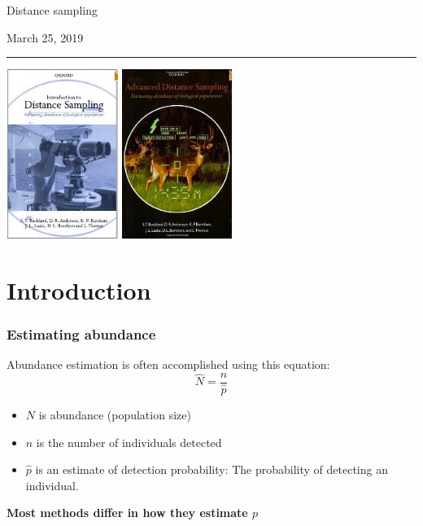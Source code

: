 \documentclass[color=usenames,dvipsnames]{beamer}\usepackage[]{graphicx}\usepackage[]{color}
\begin{document}
\begin{frame}[plain]
  \begin{center}
    {\huge Distance sampling \par}
    \vspace{0.5cm}
    { \Large March 25, 2019} \\
    {\color{RoyalBlue} \rule{\textwidth}{1pt}}
    \vfill
    \includegraphics[height=5.5cm,keepaspectratio]{figs/book1} %
    \hspace{0.5cm}
      \includegraphics[height=5.5cm,keepaspectratio,trim = 0mm
        0mm 0mm 0mm, clip]{figs/book2}
  \end{center}
\end{frame}




\section{Introduction}



\begin{frame}
  \frametitle{Estimating abundance}
  \large
  Abundance estimation is often accomplished using this equation:
  \[
    \hat{N} = \frac{n}{\hat{p}}
  \]
  \begin{itemize}
    \item $N$ is abundance (population size)
    \item $n$ is the number of individuals detected
    \item $\hat{p}$ is an estimate of detection probability: The probability
      of detecting an individual.
  \end{itemize}
  \pause
  \vfill
  \centering
  \bf
  Most methods differ in how they estimate $p$ \\
\end{frame}
\end{document}
